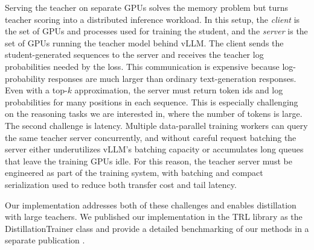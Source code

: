 Serving the teacher on separate GPUs solves the memory problem but turns teacher scoring into a distributed inference workload. In this setup, the \emph{client} is the set of GPUs and processes used for training the student, and the \emph{server} is the set of GPUs running the teacher model behind vLLM. The client sends the student-generated sequences to the server and receives the teacher log probabilities needed by the loss. This communication is expensive because log-probability responses are much larger than ordinary text-generation responses. Even with a top-$k$ approximation, the server must return token ids and log probabilities for many positions in each sequence. This is especially challenging on the reasoning tasks we are interested in, where the number of tokens is large. The second challenge is latency. Multiple data-parallel training workers can query the same teacher server concurrently, and without careful request batching the server either underutilizes vLLM's batching capacity or accumulates long queues that leave the training GPUs idle. For this reason, the teacher server must be engineered as part of the training system, with batching and compact serialization used to reduce both transfer cost and tail latency.

Our implementation addresses both of these challenges and enables distillation with large teachers. We published our implementation in the TRL library \citep{vonwerra2020trl} as the DistillationTrainer class and provide a detailed benchmarking of our methods in a separate publication \citep{patino2026_distilling_100b_models_40x_faster_with_trl}.